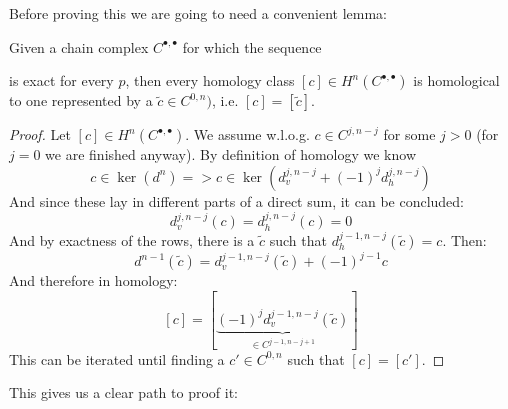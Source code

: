 Before proving this we are going to need a convenient lemma:
\begin{lemma}
\label{lemma:helpfull}
Given a chain complex $C^{\bullet, \bullet}$ for which the sequence
\begin{center}
\end{center}
is exact for every $p$, then every homology class
$[c] \in H^n(C^{\bullet, \bullet})$ is homological to one represented by a
$\tilde{c} \in C^{0,n})$, i.e. $[c] = [\tilde{c}]$.
\end{lemma}
\begin{proof}
Let $[c] \in H^n(C^{\bullet, \bullet})$. We assume w.l.o.g. $c \in C^{j, n - j}$
for some $j > 0$ (for $j = 0$ we are finished anyway). By definition of homology
we know
\[
	c \in \ker(d^n) => c \in \ker(d^{j, n - j}_v + (-1)^j d^{j, n - j}_h)
\]
And since these lay in different parts of a direct sum, it can be concluded:
\[
	d^{j, n - j}_v(c) = d^{j, n - j}_h(c) = 0
\]
And by exactness of the rows, there is a $\tilde{c}$ such that
$d^{j - 1, n - j}_h(\tilde{c}) = c$. Then:
\[
	d^{n - 1}(\tilde{c}) = d^{j - 1, n - j}_v(\tilde{c}) + (-1)^{j - 1} c
\]
And therefore in homology:
\[
	[c] = [\underbrace{
		(-1)^{j} d^{j - 1, n - j}_v(\tilde{c})
	}_{\in C^{j - 1, n - j + 1}}]
\]
This can be iterated until finding a $c' \in C^{0, n}$ such that $[c] = [c']$.
\end{proof}
This gives us a clear path to proof it:
